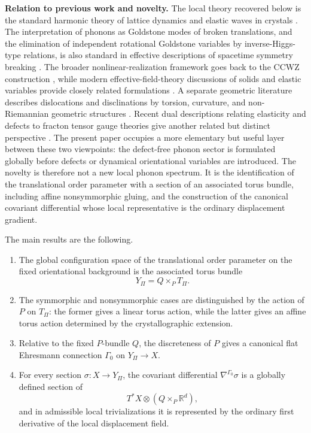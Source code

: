 \documentclass[11pt]{amsart}
\theoremstyle{plain}
\theoremstyle{definition}
\theoremstyle{remark}
\begin{document}
\noindent\textbf{Relation to previous work and novelty.}
The local theory recovered below is the standard harmonic theory of lattice dynamics and elastic waves in crystals \cite{BornHuang,LandauLifshitzElasticity,NyePhysicalProperties,MusgraveCrystalAcoustics}. 
The interpretation of phonons as Goldstone modes of broken translations, and the elimination of independent rotational Goldstone variables by inverse-Higgs-type relations, is also standard in effective descriptions of spacetime symmetry breaking \cite{LeutwylerPhonons,LowManohar,WatanabeMurayama2013,BraunerInverseHiggs,BraunerBook}. The broader nonlinear-realization framework goes back to the CCWZ construction \cite{ColemanWessZumino1969,CallanColemanWessZumino1969}, while modern effective-field-theory discussions of solids and elastic variables provide closely related formulations \cite{NicolisEtAl2015,HayataHidaka2014}. 
A separate geometric literature describes dislocations and disclinations by torsion, curvature, and non-Riemannian geometric structures \cite{BilbyBulloughSmith1955,Kroner1981,deWit1973,KatanaevVolovich1992,Katanaev2005,KleinertGaugeFields,MuraMicromechanics}. Recent dual descriptions relating elasticity and defects to fracton tensor gauge theories give another related but distinct perspective \cite{PretkoRadzihovsky2018,PretkoZhaiRadzihovsky2019,PretkoChenYou2020,GromovRadzihovsky2024}. 
The present paper occupies a more elementary but useful layer between these two viewpoints: the defect-free phonon sector is formulated globally before defects or dynamical orientational variables are introduced. 
The novelty is therefore not a new local phonon spectrum. 
It is the identification of the translational order parameter with a section of an associated torus bundle, including affine nonsymmorphic gluing, and the construction of the canonical covariant differential whose local representative is the ordinary displacement gradient.

The main results are the following.
\begin{enumerate}[label=\textup{(\roman*)}]
\item The global configuration space of the translational order parameter on the fixed orientational background is the associated torus bundle
\[
Y_\Pi=Q\times_P T_\Pi.
\]
\item The symmorphic and nonsymmorphic cases are distinguished by the action of \(P\) on \(T_\Pi\): the former gives a linear torus action, while the latter gives an affine torus action determined by the crystallographic extension.
\item Relative to the fixed \(P\)-bundle \(Q\), the discreteness of \(P\) gives a canonical flat Ehresmann connection \(\Gamma_0\) on \(Y_\Pi\to X\).
\item For every section \(\sigma:X\to Y_\Pi\), the covariant differential \(\nabla^{\Gamma_0}\sigma\) is a globally defined section of
\[
T^*X\otimes(Q\times_P\mathbb R^d),
\]
and in admissible local trivializations it is represented by the ordinary first derivative of the local displacement field.
\end{enumerate}
\end{document}
